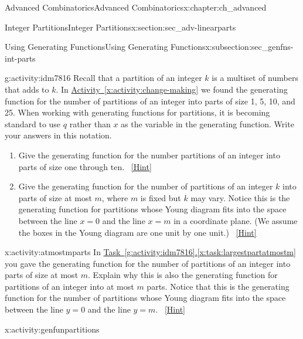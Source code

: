 \documentclass[oneside,10pt,]{book}
\numberwithin{equation}{chapter}
\begin{document}
\begin{chapterptx}{Advanced Combinatorics}{}{Advanced Combinatorics}{}{}{x:chapter:ch_advanced}
\begin{sectionptx}{Integer Partitions}{}{Integer Partitions}{}{}{x:section:sec_adv-linearparts}
\begin{subsectionptx}{Using Generating Functions}{}{Using Generating Functions}{}{}{x:subsection:sec_genfns-int-parts}
\begin{activity}{}{g:activity:idm7816}%
Recall that a partition of an integer \(k\) is a multiset of numbers that adds to \(k\). In \hyperref[x:activity:change-making]{Activity~\ref{x:activity:change-making}} we found the generating function for the number of partitions of an integer into parts of size 1, 5, 10, and 25. When working with generating functions for partitions, it is becoming standard to use \(q\) rather than \(x\) as the variable in the generating function.  Write your answers in this notation.\footnotemark{}%
\begin{enumerate}[font=\bfseries,label=(\alph*),ref=\alph*]
\item{}Give the generating function for the number partitions of an integer into parts of size one through ten.%
\qquad~\hfill{\tiny\hyperlink{g:hint:idm7829-back}{[Hint]}}\item\label{x:task:largestpartatmostm}Give the generating function for the number of partitions of an integer \(k\) into parts of size at most \(m\), where \(m\) is fixed but \(k\) may vary. Notice this is the generating function for partitions whose Young diagram fits into the space between the line \(x=0\) and the line \(x=m\) in a coordinate plane. (We assume the boxes in the Young diagram are one unit by one unit.)%
\qquad~\hfill{\tiny\hyperlink{g:hint:idm7843-back}{[Hint]}}\end{enumerate}
\end{activity}
%
\begin{activity}{}{x:activity:atmostmparts}%
In \hyperref[x:task:largestpartatmostm]{Task~\ref{g:activity:idm7816}.\ref{x:task:largestpartatmostm}} you gave the generating function for the number of partitions of an integer into parts of size at most \(m\). Explain why this is also the generating function for partitions of an integer into at most \(m\) parts. Notice that this is the generating function for the number of partitions whose Young diagram fits into the space between the line \(y=0\) and the line \(y=m\).%
\qquad~\hfill{\tiny\hyperlink{g:hint:idm7857-back}{[Hint]}}\end{activity}
\begin{activity}{}{x:activity:genfunpartitions}%

\end{activity}
\end{subsectionptx}
\end{sectionptx}
\end{chapterptx}
\end{document}
